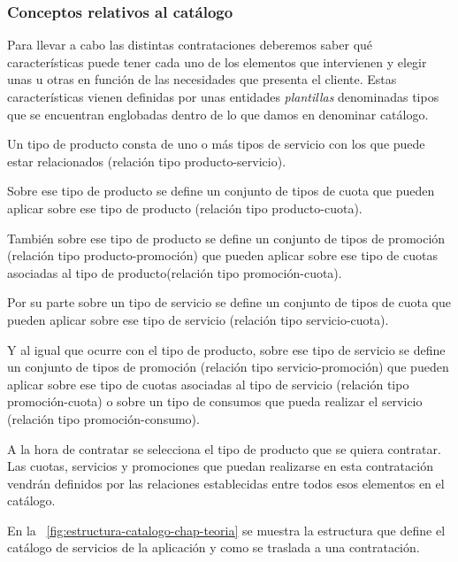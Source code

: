 \subsubsection{Conceptos relativos al catálogo}
\label{sub:catálogo-conceptos-chap-teoria}


Para llevar a cabo las distintas contrataciones deberemos saber qué características puede tener cada uno de los elementos que intervienen y elegir unas u otras en función de las necesidades que presenta el cliente. Estas características vienen definidas por unas entidades \textit{plantillas} denominadas tipos que se encuentran englobadas dentro de lo que damos en denominar catálogo. 


Un tipo de producto consta de uno o más tipos de servicio con los que puede estar relacionados (relación tipo producto-servicio). 

Sobre ese tipo de producto se define un conjunto de tipos de cuota que pueden aplicar sobre ese tipo de producto (relación tipo producto-cuota).

También sobre ese tipo de producto se define un conjunto de tipos de promoción (relación tipo producto-promoción) que pueden aplicar sobre ese tipo de cuotas asociadas al tipo de producto(relación tipo promoción-cuota).

Por su parte sobre un tipo de servicio se define un conjunto de tipos de cuota que pueden aplicar sobre ese tipo de servicio (relación tipo servicio-cuota).

Y al igual que ocurre con el tipo de producto, sobre ese tipo de servicio se define un conjunto de tipos de promoción (relación tipo servicio-promoción) que pueden aplicar sobre ese tipo de cuotas asociadas al tipo de servicio (relación tipo promoción-cuota) o sobre un tipo de consumos que pueda realizar el servicio (relación tipo promoción-consumo).

A la hora de contratar se selecciona el tipo de producto que se quiera contratar. Las cuotas, servicios y promociones que puedan realizarse en esta contratación vendrán definidos por las relaciones establecidas entre todos esos elementos en el catálogo.


En la \figurename~\ref{fig:estructura-catalogo-chap-teoria} se muestra la estructura que define el catálogo de servicios de la aplicación y como se traslada a una contratación.

